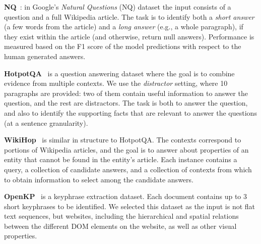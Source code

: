 \documentclass[11pt,a4paper]{article}
\begin{document}
{\bf NQ}~\cite{kwiatkowski2019natural}: in Google's {\em Natural Questions} (NQ) dataset the input consists of a question and a full Wikipedia article. The task is to identify both a {\em short answer} (a few words from the article) and a {\em long answer} (e.g., a whole paragraph), if they exist within the article (and otherwise, return null answers). Performance is measured based on the F1 score of the model predictions with respect to the human generated answers. 

{\bf HotpotQA}~\cite{yang2018hotpotqa} is a question answering dataset where the goal is to combine evidence from multiple contexts. We use the {\em distractor} setting, where 10 paragraphs are provided: two of them contain useful information to answer the question, and the rest are distractors. The task is both to answer the question, and also to identify the supporting facts that are relevant to answer the questions (at a sentence granularity). 

{\bf WikiHop}~\cite{welbl2018constructing} is similar in structure to HotpotQA. The contexts correspond to portions of Wikipedia articles, and the goal is to answer about properties of an entity that cannot be found in the entity's article. Each instance contains a query, a collection of candidate answers, and a collection of contexts from which to obtain information to select among the candidate answers.

{\bf OpenKP}~\cite{xiong2019open} is a keyphrase extraction dataset. Each document contains up to 3 short keyphrases to be identified. We selected this dataset as the input is not flat text sequences, but websites, including the hierarchical and spatial relations between the different DOM elements on the website, as well as other visual properties.



\begin{table}[tb]\centering 
{}
\caption{Dataset stats (length in word piece tokens).}
\label{tbl:datasets} 
\end{table}
\end{document}
